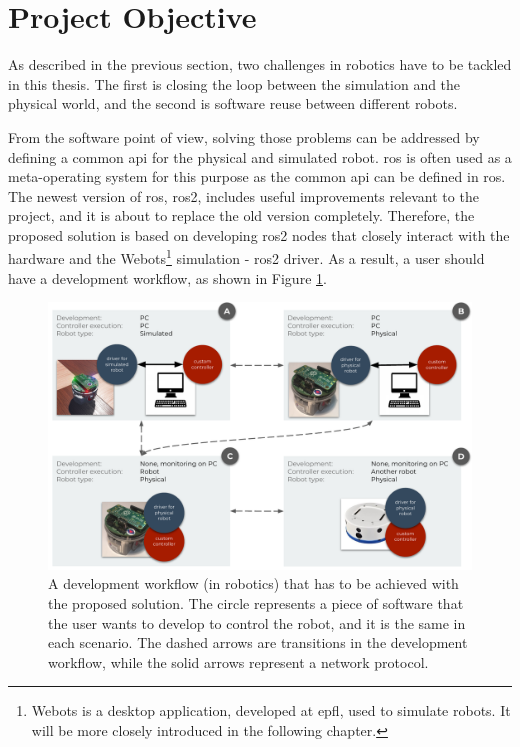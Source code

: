 \section{Project Objective}

As described in the previous section, two challenges in robotics have to be tackled in this thesis.
The first is closing the loop between the simulation and the physical world, and the second is software reuse between different robots.

From the software point of view, solving those problems can be addressed by defining a common \ac{api} for the physical and simulated robot.
\ac{ros} is often used as a meta-operating system for this purpose as the common \ac{api} can be defined in \ac{ros}.
The newest version of \ac{ros}, \ac{ros2}, includes useful improvements relevant to the project, and it is about to replace the old version completely.
Therefore, the proposed solution is based on developing \ac{ros2} nodes that closely interact with the hardware and the Webots\footnote{Webots is a desktop application, developed at \ac{epfl}, used to simulate robots.
It will be more closely introduced in the following chapter.} simulation - \ac{ros2} driver.
As a result, a user should have a development workflow, as shown in Figure \ref{fig:introduction:desired_workflow}.

\begin{figure}[H]
    \centering
    \includegraphics[width=\textwidth]{introduction/figures/desired_workflow.pdf}
    \caption[A development workflow (in robotics) that has to be achieved with the proposed solution]{
        A development workflow (in robotics) that has to be achieved with the proposed solution.
        The circle represents a piece of software that the user wants to develop to control the robot, and it is the same in each scenario.
        The dashed arrows are transitions in the development workflow, while the solid arrows represent a network protocol.
    }
    \label{fig:introduction:desired_workflow}
\end{figure}


